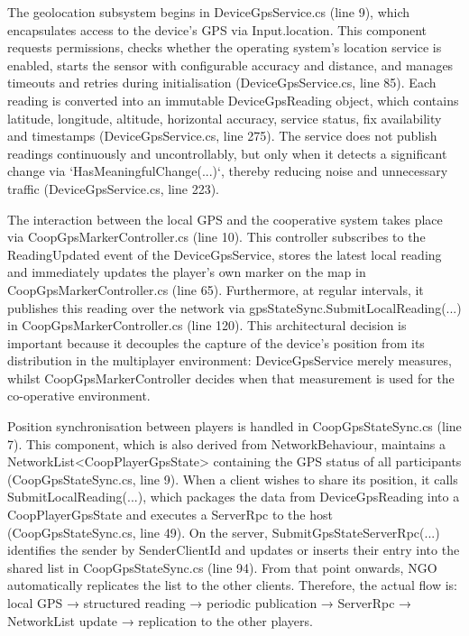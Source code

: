 The geolocation subsystem begins in DeviceGpsService.cs (line 9), which encapsulates access to the device’s GPS via Input.location. This component requests permissions, checks whether the operating system’s location service is enabled, starts the sensor with configurable accuracy and distance, and manages timeouts and retries during initialisation (DeviceGpsService.cs, line 85). Each reading is converted into an immutable DeviceGpsReading object, which contains latitude, longitude, altitude, horizontal accuracy, service status, fix availability and timestamps (DeviceGpsService.cs, line 275). The service does not publish readings continuously and uncontrollably, but only when it detects a significant change via `HasMeaningfulChange(...)`, thereby reducing noise and unnecessary traffic (DeviceGpsService.cs, line 223).

The interaction between the local GPS and the cooperative system takes place via CoopGpsMarkerController.cs (line 10). This controller subscribes to the ReadingUpdated event of the DeviceGpsService, stores the latest local reading and immediately updates the player’s own marker on the map in CoopGpsMarkerController.cs (line 65). Furthermore, at regular intervals, it publishes this reading over the network via gpsStateSync.SubmitLocalReading(...) in CoopGpsMarkerController.cs (line 120). This architectural decision is important because it decouples the capture of the device’s position from its distribution in the multiplayer environment: DeviceGpsService merely measures, whilst CoopGpsMarkerController decides when that measurement is used for the co-operative environment.

Position synchronisation between players is handled in CoopGpsStateSync.cs (line 7). This component, which is also derived from NetworkBehaviour, maintains a NetworkList<CoopPlayerGpsState> containing the GPS status of all participants (CoopGpsStateSync.cs, line 9). When a client wishes to share its position, it calls SubmitLocalReading(...), which packages the data from DeviceGpsReading into a CoopPlayerGpsState and executes a ServerRpc to the host (CoopGpsStateSync.cs, line 49). On the server, SubmitGpsStateServerRpc(...) identifies the sender by SenderClientId and updates or inserts their entry into the shared list in CoopGpsStateSync.cs (line 94). From that point onwards, NGO automatically replicates the list to the other clients. Therefore, the actual flow is: local GPS → structured reading → periodic publication → ServerRpc → NetworkList update → replication to the other players.

